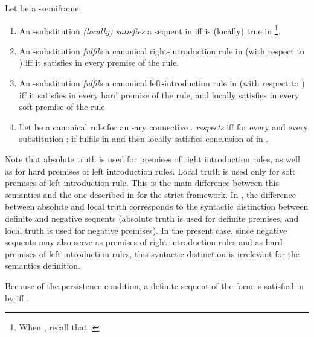 \documentclass{LMCS}
\theoremstyle{remark}
\newcommand{\be}{\begin{enumerate}[(1)]}
\newcommand{\ee}{\end{enumerate}}
\begin{document}
\begin{defi}
\label{substitution satisfaction, fulfil and respect} 
Let  be a -semiframe.
\be
\item 
An -substitution  {\em (locally) satisfies} a sequent  in 
 iff  is (locally) true in \footnote{When , recall that .}.
\item 
An -substitution {\em fulfils} a canonical right-introduction rule in
 (with respect to ) iff it satisfies in  every premise of the rule.
\item
An -substitution {\em fulfils} a canonical left-introduction rule in
 (with respect to ) iff it satisfies in  every hard premise of the rule,
and locally satisfies in  every soft premise of the rule.
\item
Let  be a canonical rule for an -ary connective .
 {\em respects} 
iff for every  and every substitution :
if  fulfils  in  and 
then  locally satisfies conclusion of  in .
\ee
\end{defi}

\noindent Note that absolute truth is used for premises of right
introduction rules, as well as for hard premises of left introduction
rules.  Local truth is used only for soft premises of left
introduction rule.  This is the main difference between this semantics
and the one described in \cite{AL10} for the strict framework.  In
\cite{AL10}, the difference between absolute and local truth
corresponds to the syntactic distinction between definite and negative
sequents (absolute truth is used for definite premises, and local
truth is used for negative premises).  In the present case, since
negative sequents may also serve as premises of right introduction
rules and as hard premises of left introduction rules, this syntactic
distinction is irrelevant for the semantics definition.

\begin{rem}
Because of the persistence condition,
a definite sequent of the form
 is satisfied in  by  iff .
\end{rem}
\end{document}
